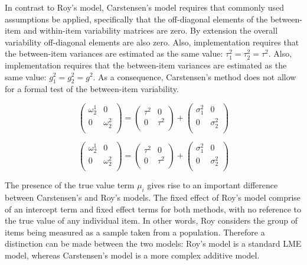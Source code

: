 \documentclass{report}
\begin{document}
	In contrast to Roy's model, Carstensen's model requires that commonly used assumptions be applied, specifically that the off-diagonal elements of the between-item and within-item variability matrices are zero. By
	extension the overall variability off-diagonal elements are also zero. Also, implementation requires that the between-item variances are estimated as the same value: $\tau^2_1 = \tau^2_2 = \tau^2$.
	Also, implementation requires that the between-item variances are estimated as the same value: $g^2_1 = g^2_2 = g^2$.
	As a consequence, Carstensen's method does not allow for a formal test of the between-item variability.
	
	\[\left(\begin{array}{cc}
	\omega^1_2  & 0 \\
	0 & \omega^2_2 \\
	\end{array}  \right)
	=  \left(
	\begin{array}{cc}
	\tau^2  & 0 \\
	0 & \tau^2 \\
	\end{array} \right)+
	\left(
	\begin{array}{cc}
	\sigma^2_1  & 0 \\
	0 & \sigma^2_2 \\
	\end{array}\right)
	\]
	
	
	\[\left(\begin{array}{cc}
	\omega^1_2  & 0 \\
	0 & \omega^2_2 \\
	\end{array}  \right)
	=  \left(
	\begin{array}{cc}
	\tau^2  & 0 \\
	0 & \tau^2 \\
	\end{array} \right)+
	\left(
	\begin{array}{cc}
	\sigma^2_1  & 0 \\
	0 & \sigma^2_2 \\
	\end{array}\right)
	\]
	
	The presence of the true value term $\mu_i$ gives rise to an important difference between Carstensen's and Roy's models. The fixed effect of Roy's model comprise of an intercept term and fixed effect terms for both methods, with no reference to the true value of any individual item. In other words, Roy considers the group of items being measured as a sample taken from a population. Therefore a distinction can be made between the two models: Roy's model is a standard LME model, whereas Carstensen's model is a more complex additive model.
	
\end{document}
